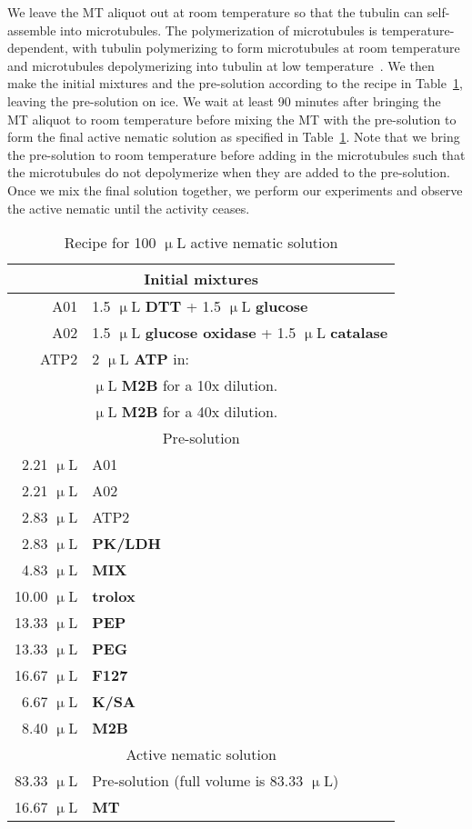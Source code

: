We leave the MT aliquot out at room temperature so that the tubulin can self-assemble into microtubules.
The polymerization of microtubules is temperature-dependent, with tubulin polymerizing to form microtubules at room temperature and microtubules depolymerizing into tubulin at low temperature~\cite{RN3}.
We then make the initial mixtures and the pre-solution according to the recipe in Table~\ref{t:3-recipe}, leaving the pre-solution on ice.
We wait at least 90 minutes after bringing the MT aliquot to room temperature before mixing the MT with the pre-solution to form the final active nematic solution as specified in Table~\ref{t:3-recipe}.
Note that we bring the pre-solution to room temperature before adding in the microtubules such that the microtubules do not depolymerize when they are added to the pre-solution.
Once we mix the final solution together, we perform our experiments and observe the active nematic until the activity ceases.

\begin{table}[ht]
  \centering
  \caption{Recipe for 100 $\upmu$L active nematic solution}
  \begin{tabular}{|r l|}
    \hline
    \multicolumn{2}{|c|}{Initial mixtures}\\
    \hline
    A01 & 1.5 $\upmu$L {\bf DTT} + 1.5 $\upmu$L {\bf glucose} \\
    A02 & 1.5 $\upmu$L {\bf glucose oxidase} + 1.5 $\upmu$L {\bf catalase} \\
    ATP2 & 2 $\upmu$L {\bf ATP} in:\\
    & \quad 18 $\upmu$L {\bf M2B} for a 10x dilution.\\
    & \quad 38 $\upmu$L {\bf M2B} for a 40x dilution.\\
    \hline
    \multicolumn{2}{|c|}{Pre-solution}\\
    \hline
    2.21 $\upmu$L & A01\\
    2.21 $\upmu$L & A02\\
    2.83 $\upmu$L & ATP2\\
    2.83 $\upmu$L & {\bf PK/LDH} \\
    4.83 $\upmu$L & {\bf MIX}\\
    10.00 $\upmu$L & {\bf trolox}\\
    13.33 $\upmu$L & {\bf PEP}\\
    13.33 $\upmu$L & {\bf PEG}\\
    16.67 $\upmu$L & {\bf F127}\\
    6.67 $\upmu$L & {\bf K/SA}\\
    8.40 $\upmu$L & {\bf M2B}\\
    \hline
    \multicolumn{2}{|c|}{Active nematic solution}\\
    \hline
    83.33 $\upmu$L & Pre-solution (full volume is 83.33 $\upmu$L)\\
    16.67 $\upmu$L & {\bf MT}\\
    \hline
  \end{tabular}
  \label{t:3-recipe}
\end{table}


